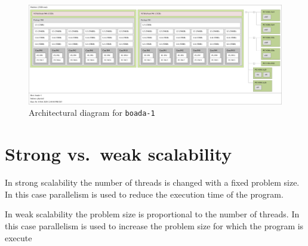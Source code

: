 \begin{figure}[H]%
    \caption{Architectural diagram for \texttt{boada-1}}%
    \label{fig:arch_boada1}
    \centering
    \includegraphics[width=\textwidth]{./data/map-boada-1.pdf}
\end{figure}



\section{Strong vs.\ weak scalability}%
\label{sec:strong_vs_weak_scalability}


In strong scalability  the  number  of  threads  is  changed  with  a  fixed  problem  size.   In  this  case parallelism is used to reduce the execution time of the program.

In weak scalability the problem size is proportional to the number of threads. In this case parallelism is used to increase the problem size for which the program is execute

